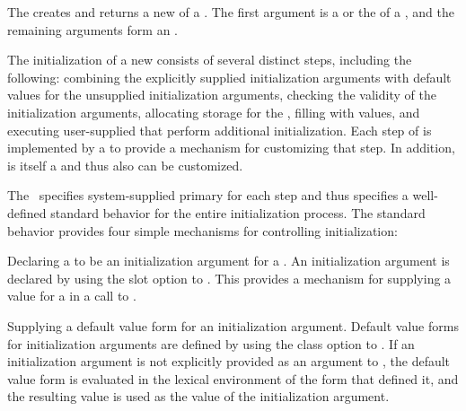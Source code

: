 
                      
The   creates and returns a new
 of a .  The first argument is a  or
the  of a , and the remaining arguments form an 
.

The initialization of a new  consists of several distinct
steps, including the following: combining the explicitly supplied initialization
arguments with default values for the unsupplied initialization arguments, 
checking the validity of the initialization arguments, allocating storage 
for the , filling  with
values, and executing user-supplied  that perform additional
initialization.  Each step of  is implemented by a
 to provide a mechanism for customizing that step.  
In addition,  is itself a  
and thus also can be customized.

The \OS\ specifies system-supplied primary  for each step 
and thus specifies a well-defined standard behavior for the entire
initialization process.  The standard behavior provides four simple
mechanisms for controlling initialization:

\beginlist

\itemitem{\bull} Declaring a  to be an initialization argument 
for a .  An initialization argument is declared by using the
 slot option to .  This provides a mechanism
for supplying a value for a  in a call to .

\itemitem{\bull} Supplying a default value form for an initialization argument.
Default value forms for initialization arguments are defined by using the
 class option to .  If an 
initialization argument is not explicitly provided
as an argument to , the default value form is
evaluated in the lexical environment of the  form that
defined it, and the resulting value is used as the value of the
initialization argument.

